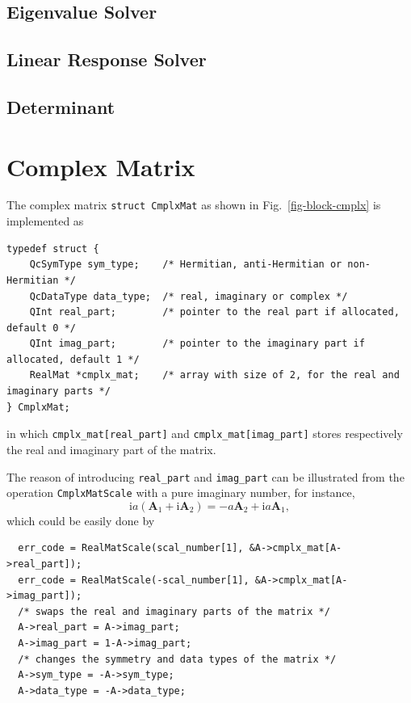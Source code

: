 \documentclass[a4paper,11pt,twoside,openright]{book}
\begin{document}
\subsection{Eigenvalue Solver}

\subsection{Linear Response Solver}

\subsection{Determinant}

\section{Complex Matrix}
\label{section-complex-matrix}

The complex matrix \verb|struct CmplxMat| as shown in Fig.~\ref{fig-block-cmplx}
is implemented as
\begin{verbatim}
typedef struct {
    QcSymType sym_type;    /* Hermitian, anti-Hermitian or non-Hermitian */
    QcDataType data_type;  /* real, imaginary or complex */
    QInt real_part;        /* pointer to the real part if allocated, default 0 */
    QInt imag_part;        /* pointer to the imaginary part if allocated, default 1 */
    RealMat *cmplx_mat;    /* array with size of 2, for the real and imaginary parts */
} CmplxMat;
\end{verbatim}
in which \verb|cmplx_mat[real_part]| and \verb|cmplx_mat[imag_part]| stores respectively
the real and imaginary part of the matrix.

The reason of introducing \verb|real_part| and \verb|imag_part| can be illustrated
from the operation \verb|CmplxMatScale| with a pure imaginary number, for instance,
\begin{equation}
  \text{i}a(\mathbf{A}_{1}+\text{i}\mathbf{A}_{2})=-a\mathbf{A}_{2}+\text{i}a\mathbf{A}_{1},
\end{equation}
which could be easily done by
\begin{verbatim}
  err_code = RealMatScale(scal_number[1], &A->cmplx_mat[A->real_part]);
  err_code = RealMatScale(-scal_number[1], &A->cmplx_mat[A->imag_part]);
  /* swaps the real and imaginary parts of the matrix */
  A->real_part = A->imag_part;
  A->imag_part = 1-A->imag_part;
  /* changes the symmetry and data types of the matrix */
  A->sym_type = -A->sym_type;
  A->data_type = -A->data_type;
\end{verbatim}
\end{document}
